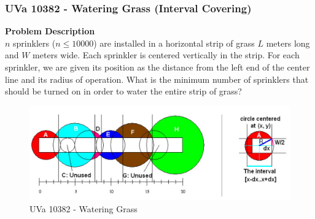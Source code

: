 \documentclass{beamer}
\begin{document}
\begin{frame}[fragile]
\frametitle{UVa 10382 - Watering Grass (Interval Covering)}

\color{red}\textbf{Problem Description}\color{black} \\
$n$ sprinklers ($n\leq 10000$) are installed in a horizontal strip of grass $L$ meters long and $W$ meters wide. Each sprinkler is centered vertically in the strip. For each sprinkler, we are given its position as the distance from the left end of the center line and its radius of operation. What is the minimum number of sprinklers that should be turned on in order to water the entire strip of grass?

\begin{figure}
    \centering
    \includegraphics[scale=0.25]{imgs/uva_10382_1.png}
    \caption{UVa 10382 - Watering Grass}
\end{figure}

\end{frame}
\end{document}
